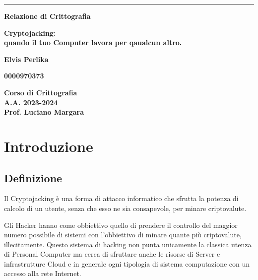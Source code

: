 \documentclass[12pt,a4paper]{article}
\begin{document}
\begin{titlepage}
\begin{center}
\rule[0.5cm]{15.8cm}{0.6mm}
{\small{\bf Relazione di Crittografia }}
\end{center}
\vspace{15mm}
\begin{center}
{\LARGE{\bf Cryptojacking:} \\ 
\vspace{3mm}
{\bf quando il tuo Computer lavora per qaualcun altro.}}
\end{center}
\vspace{35mm}
\par
\noindent
\begin{center}
{\large{\bf
Elvis Perlika}}
\end{center}
\begin{center}
{\large{\bf
0000970373}}
\end{center}
\hfill

\vspace{70mm}
\begin{center}
{\large{\bf Corso di Crittografia \\ 
A.A. 2023-2024 \\
Prof. Luciano Margara}}
\end{center}
\end{titlepage}

\newpage

\tableofcontents

\newpage

\section{Introduzione}
\subsection{Definizione}

Il Cryptojacking è una forma di attacco informatico che sfrutta la potenza 
di calcolo di un utente, senza che esso ne sia consapevole, per minare criptovalute. \cite{CSO}

Gli Hacker hanno come obbiettivo quello di prendere il controllo del maggior numero 
possibile di sistemi con l'obbiettivo di minare quante più criptovalute, illecitamente. 
Questo sistema di hacking non punta unicamente la classica utenza di Personal Computer ma 
cerca di sfruttare anche le risorse di Server e infrastrutture Cloud e in generale 
ogni tipologia di sistema computazione con un accesso alla rete Internet.
\end{document}
